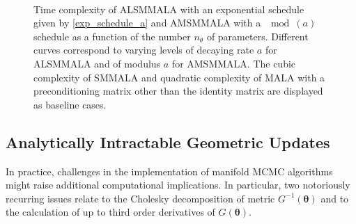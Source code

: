 \documentclass[twoside,11pt]{article}
\begin{document}
\begin{figure}[t]
	\centering
	 \\
	\caption{
		Time complexity of ALSMMALA with an exponential schedule given by \eqref{exp_schedule_a} and AMSMMALA with a $\mod{(a)}$ 
		schedule as a function of the number $n_{\theta}$ of parameters. Different curves correspond to varying levels of 
		decaying rate $a$ for ALSMMALA and of modulus $a$ for AMSMMALA. The cubic complexity of SMMALA and quadratic complexity
		of MALA with a preconditioning matrix other than the identity matrix are displayed as baseline cases.
	}
	\label{fig:alsmmala_amsmmala_schedule}
\end{figure}

\subsection{Analytically Intractable Geometric Updates}

In practice, challenges in the implementation of manifold MCMC algorithms might raise additional computational implications.
In particular, two notoriously recurring issues relate to the Cholesky decomposition of metric $G^{-1}(\boldsymbol{\theta})$ 
and to the calculation of up to third order derivatives of $G(\boldsymbol{\theta})$.
\end{document}
